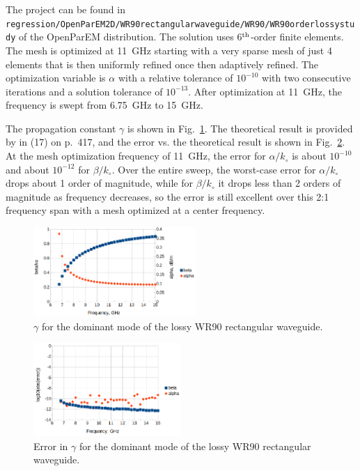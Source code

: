 \documentclass[titlepage]{article}
\renewcommand\_{\textunderscore\linebreak[1]}
\begin{document}
The project can be found in \texttt{regression/OpenParEM2D/WR90\_rectangular\_waveguide/WR90/WR90\_order\_6\_lossy\_study} of the OpenParEM distribution. The solution uses 6$^{\textnormal{th}}$-order finite elements. The mesh is optimized at 11~GHz starting with a very sparse mesh of just 4 elements that is then uniformly refined once then adaptively refined. The optimization variable is $\alpha$ with a relative tolerance of $10^{-10}$ with two consecutive iterations and a solution tolerance of $10^{-13}$. After optimization at 11~GHz, the frequency is swept from 6.75~GHz to 15~GHz.

The propagation constant $\gamma$ is shown in Fig.~\ref{fig:WR90_lossy_gamma}.  The theoretical result is provided by \cite{Ramo} in (17) on p.~417, and the error vs. the theoretical result is shown in Fig.~\ref{fig:WR90_lossy_gamma_error}.  At the mesh optimization frequency of 11~GHz, the error for $\alpha/k_{\circ}$ is about $10^{-10}$ and about $10^{-12}$ for $\beta/k_{\circ}$.  Over the entire sweep, the worst-case error for $\alpha/k_{\circ}$ drops about 1 order of magnitude, while for $\beta/k_{\circ}$ it drops less than 2 orders of magnitude as frequency decreases, so the error is still excellent over this 2:1 frequency span with a mesh optimized at a center frequency.

\begin{figure}[H]
  \centering
  \includegraphics[width=0.55\textwidth]{../regression/OpenParEM2D/WR90_rectangular_waveguide/WR90/WR90_order_6_lossy_study/screenshots/WR90_lossy_gamma}
  \caption{$\gamma$ for the dominant mode of the lossy WR90 rectangular waveguide.}
  \label{fig:WR90_lossy_gamma}
\end{figure}

\begin{figure}[H]
  \centering
  \includegraphics[width=0.5\textwidth]{../regression/OpenParEM2D/WR90_rectangular_waveguide/WR90/WR90_order_6_lossy_study/screenshots/WR90_lossy_gamma_error}
  \caption{Error in $\gamma$ for the dominant mode of the lossy WR90 rectangular waveguide.}
  \label{fig:WR90_lossy_gamma_error}
\end{figure}
\end{document}
